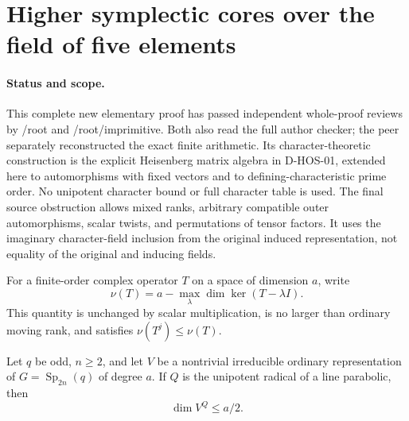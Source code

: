 \section{Higher symplectic cores over the field of five elements}
\label{sec:higher-symplectic-five}

\paragraph{Status and scope.}
This complete new elementary proof has passed independent whole-proof
reviews by /root and /root/imprimitive. Both also read the full author
checker; the peer separately reconstructed the exact finite arithmetic.
Its character-theoretic construction is the explicit
Heisenberg matrix algebra in D-HOS-01, extended here to automorphisms
with fixed vectors and to defining-characteristic prime order. No
unipotent character bound or full character table is used. The final
source obstruction allows mixed ranks, arbitrary compatible outer
automorphisms, scalar twists, and permutations of tensor factors.
It uses the imaginary character-field inclusion from the original
induced representation, not equality of the original and inducing fields.

For a finite-order complex operator $T$ on a space of dimension $a$, write
\[
 \nu(T)=a-\max_\lambda\dim\ker(T-\lambda I).
                                                               \tag{HOS5.1}
\]
This quantity is unchanged by scalar multiplication, is no larger than
ordinary moving rank, and satisfies $\nu(T^j)\le\nu(T)$.

\begin{lemma}
\label{D-HOS-07}
Let $q$ be odd, $n\ge2$, and let $V$ be a nontrivial irreducible
ordinary representation of $G=\operatorname{Sp}_{2n}(q)$ of degree $a$.
If $Q$ is the unipotent radical of a line parabolic, then
\[
                         \dim V^Q\le a/2.                     \tag{HOS5.2}
\]
\end{lemma}


